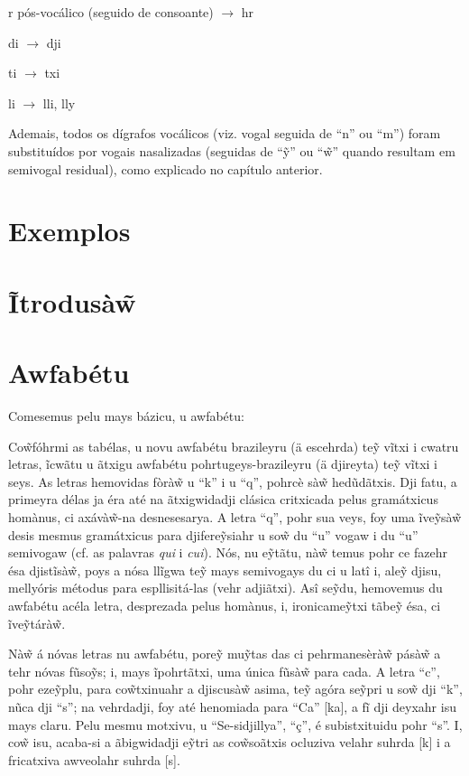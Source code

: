 \documentclass[12pt, a5paper, titlepage]{article}
\begin{document}
\begin{bilingualpages}
    r pós-vocálico (seguido de consoante) $\rightarrow$ hr

    di $\rightarrow$ dji
    
    ti $\rightarrow$ txi

    li $\rightarrow$ lli, lly

    Ademais, todos os dígrafos vocálicos (viz. vogal seguida de ``n'' ou ``m'') foram substituídos por vogais nasalizadas (seguidas de ``\~y'' ou ``\~w'' quando resultam em semivogal residual), como explicado no capítulo anterior.
    
    \section{Exemplos}
    
    \leftpage
    \section{Ĩtrodusà\~w}
    
    \newpage
    \section{Awfabétu}
    Comesemus pelu mays bázicu, u awfabétu:
    \BrTableAbc
    
    Co\~wfóhrmi as tabélas, u novu awfabétu brazileyru (ä escehrda) te\~y vĩtxi i cwatru letras, ĩcwãtu u ãtxigu awfabétu pohrtugeys-brazileyru (ä djireyta) te\~y vĩtxi i seys. As letras hemovidas fòrà\~w u ``k'' i u ``q'', pohrcè sà\~w hedũdãtxis. Dji fatu, a primeyra délas ja éra até na ãtxigwidadji clásica critxicada pelus gramátxicus homànus, ci axávà\~w-na desnesesarya. A letra ``q'', pohr sua veys, foy uma ĩve\~ysà\~w desis mesmus gramátxicus para djifere\~ysiahr u so\~w du ``u'' vogaw i du ``u'' semivogaw (cf. as palavras \textit{qui} i \textit{cui}). Nós, nu e\~ytãtu, nà\~w temus pohr ce fazehr ésa djistĩsà\~w, poys a nósa llĩgwa te\~y mays semivogays du ci u latî i, ale\~y djisu, mellyóris métodus para espllisitá-las (vehr adjiãtxi). Asî se\~ydu, hemovemus du awfabétu acéla letra, desprezada pelus homànus, i, ironicame\~ytxi tãbe\~y ésa, ci ĩve\~ytárà\~w.

    Nà\~w á nóvas letras nu awfabétu, pore\~y mu\~ytas das ci pehrmanesèrà\~w pásà\~w a tehr nóvas fũso\~ys; i, mays ĩpohrtãtxi, uma única fũsà\~w para cada. A letra ``c'', pohr eze\~yplu, para co\~wtxinuahr a djiscusà\~w asima, te\~y agóra se\~ypri u so\~w dji ``k'', nũca dji ``s''; na vehrdadji, foy até henomiada para ``Ca'' [ka], a fĩ dji deyxahr isu mays claru. Pelu mesmu motxivu, u ``Se-sidjillya'', ``ç'', é subistxituidu pohr ``s''. I, co\~w isu, acaba-si a ãbigwidadji e\~ytri as co\~wsoãtxis ocluziva velahr suhrda [k] i a fricatxiva awveolahr suhrda [s].


\end{bilingualpages}
\end{document}
